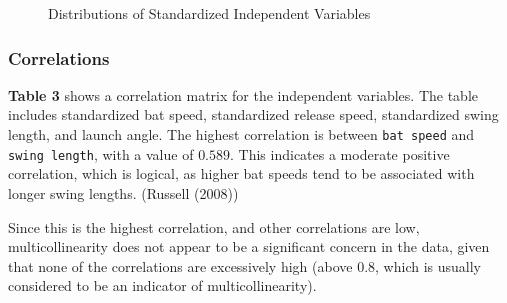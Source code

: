 \documentclass[
  letterpaper,
  DIV=11,
  numbers=noendperiod]{scrartcl}
\begin{document}
\begin{figure}[H]


\caption{\label{fig-dists}Distributions of Standardized Independent
Variables}

\end{figure}%

\newpage

\subsubsection{Correlations}\label{correlations}

\textbf{Table 3} shows a correlation matrix for the independent
variables. The table includes standardized bat speed, standardized
release speed, standardized swing length, and launch angle. The highest
correlation is between \texttt{bat\ speed} and \texttt{swing\ length},
with a value of \(0.589\). This indicates a moderate positive
correlation, which is logical, as higher bat speeds tend to be
associated with longer swing lengths. (Russell (2008))

Since this is the highest correlation, and other correlations are low,
multicollinearity does not appear to be a significant concern in the
data, given that none of the correlations are excessively high (above
0.8, which is usually considered to be an indicator of
multicollinearity).
\end{document}
